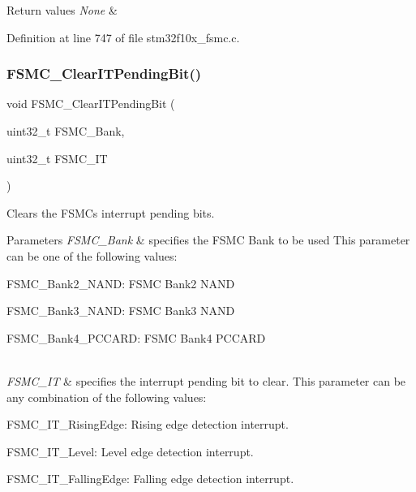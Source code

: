 \begin{DoxyRetVals}{Return values}
{\em None} & \\
\hline
\end{DoxyRetVals}


Definition at line 747 of file stm32f10x\+\_\+fsmc.\+c.

\mbox{\label{group___f_s_m_c___exported___functions_gad9387e7674b8a376256a3378649e004e}} 
\subsubsection{\texorpdfstring{F\+S\+M\+C\+\_\+\+Clear\+I\+T\+Pending\+Bit()}{FSMC\_ClearITPendingBit()}}
{\footnotesize\ttfamily void F\+S\+M\+C\+\_\+\+Clear\+I\+T\+Pending\+Bit (\begin{DoxyParamCaption}\item[{uint32\+\_\+t}]{F\+S\+M\+C\+\_\+\+Bank,  }\item[{uint32\+\_\+t}]{F\+S\+M\+C\+\_\+\+IT }\end{DoxyParamCaption})}



Clears the F\+S\+MC\textquotesingle{}s interrupt pending bits. 


\begin{DoxyParams}{Parameters}
{\em F\+S\+M\+C\+\_\+\+Bank} & specifies the F\+S\+MC Bank to be used This parameter can be one of the following values\+: \begin{DoxyItemize}
\item F\+S\+M\+C\+\_\+\+Bank2\+\_\+\+N\+A\+ND\+: F\+S\+MC Bank2 N\+A\+ND \item F\+S\+M\+C\+\_\+\+Bank3\+\_\+\+N\+A\+ND\+: F\+S\+MC Bank3 N\+A\+ND \item F\+S\+M\+C\+\_\+\+Bank4\+\_\+\+P\+C\+C\+A\+RD\+: F\+S\+MC Bank4 P\+C\+C\+A\+RD \end{DoxyItemize}
\\
\hline
{\em F\+S\+M\+C\+\_\+\+IT} & specifies the interrupt pending bit to clear. This parameter can be any combination of the following values\+: \begin{DoxyItemize}
\item F\+S\+M\+C\+\_\+\+I\+T\+\_\+\+Rising\+Edge\+: Rising edge detection interrupt. \item F\+S\+M\+C\+\_\+\+I\+T\+\_\+\+Level\+: Level edge detection interrupt. \item F\+S\+M\+C\+\_\+\+I\+T\+\_\+\+Falling\+Edge\+: Falling edge detection interrupt. \end{DoxyItemize}
\\
\hline
\end{DoxyParams}

